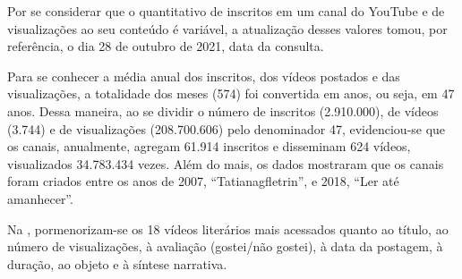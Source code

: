 \documentclass[portuguese]{textolivre}
\begin{document}
Por se considerar que o quantitativo de inscritos em um canal do YouTube
e de visualizações ao seu conteúdo é variável, a atualização desses
valores tomou, por referência, o dia 28 de outubro de 2021, data da
consulta.

Para se conhecer a média anual dos inscritos, dos vídeos postados e das
visualizações, a totalidade dos meses (574) foi convertida em anos, ou
seja, em 47 anos. Dessa maneira, ao se dividir o número de inscritos
(2.910.000), de vídeos (3.744) e de visualizações (208.700.606) pelo
denominador 47, evidenciou-se que os canais, anualmente, agregam 61.914
inscritos e disseminam 624 vídeos, visualizados 34.783.434 vezes. Além
do mais, os dados mostraram que os canais foram criados entre os anos de
2007, ``Tatianagfletrin'', e 2018, ``Ler até amanhecer''.

Na , pormenorizam-se os 18 vídeos literários mais acessados
quanto ao título, ao número de visualizações, à avaliação (gostei/não
gostei), à data da postagem, à duração, ao objeto e à síntese narrativa.
\end{document}

